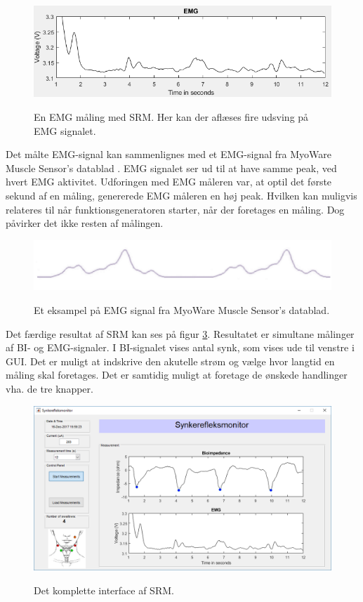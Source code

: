 \begin{figure}[H]
\centering
{\includegraphics[width=\linewidth]
{Figure/emgmaling}}
\caption{En EMG måling med SRM. Her kan der aflæses fire udsving på EMG signalet.}
\label{Fig:emgmaling}
\end{figure} 

Det målte EMG-signal kan sammenlignes med et EMG-signal fra MyoWare Muscle Sensor's datablad . EMG signalet ser ud til at have samme peak, ved hvert EMG aktivitet. Udforingen med EMG måleren var, at optil det første sekund af en måling, genererede EMG måleren en høj peak. Hvilken kan muligvis relateres til når funktionsgeneratoren starter, når der foretages en måling. Dog påvirker det ikke resten af målingen.


\begin{figure}[H]
\centering
{\includegraphics[width=\linewidth]
{Figure/emgsignal}}
\caption{Et eksampel på EMG signal fra MyoWare Muscle Sensor's datablad.}
\label{Fig:emgsignal}
\end{figure} 

Det færdige resultat af SRM kan ses på figur \ref{Fig:guiDone2}. Resultatet er simultane målinger af BI- og EMG-signaler. I BI-signalet vises antal synk, som vises ude til venstre i GUI. Det er muligt at indskrive den akutelle strøm og vælge hvor langtid en måling skal foretages. Det er samtidig muligt at foretage de ønskede handlinger vha. de tre knapper. 

\begin{figure}[H]
\centering
{\includegraphics[width=\linewidth]
{Figure/guiDone}}
\caption{Det komplette interface af SRM.}
\label{Fig:guiDone2}
\end{figure} 



